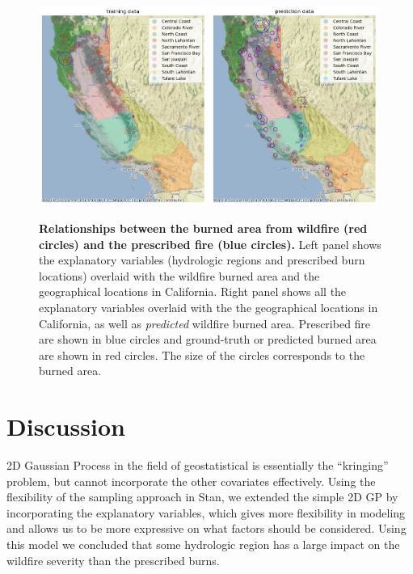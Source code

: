 \documentclass{article}
\begin{document}
\begin{figure}[!t]
  \centering
\includegraphics[width=0.49\textwidth]{latex_template/figs/trained_rez.png}
\includegraphics[width=0.49\textwidth]{latex_template/figs/predicted_rez.png}
\caption{\textbf{Relationships between the burned area from wildfire (red circles) and the prescribed fire (blue circles). } Left panel shows the explanatory variables (hydrologic regions and prescribed burn locations) overlaid with the wildfire burned area and the geographical locations in California. Right panel shows all the explanatory variables overlaid with the the geographical locations in California, as well as \textit{predicted} wildfire burned area. Prescribed fire are shown in blue circles and ground-truth or predicted burned area are shown in red circles. The size of the circles  corresponds to the burned area.}
\label{fig:pred}
\end{figure}





\section{Discussion}
2D Gaussian Process in the field of geostatistical is essentially the ``kringing'' problem, but cannot incorporate the other covariates effectively. Using the flexibility of the sampling approach in Stan, we extended the simple 2D GP by incorporating the explanatory variables, which gives more flexibility in modeling and allows us to be more expressive on what factors should be considered. Using this model we concluded that some hydrologic region has a large impact on the wildfire severity than the prescribed burns. 
\end{document}
